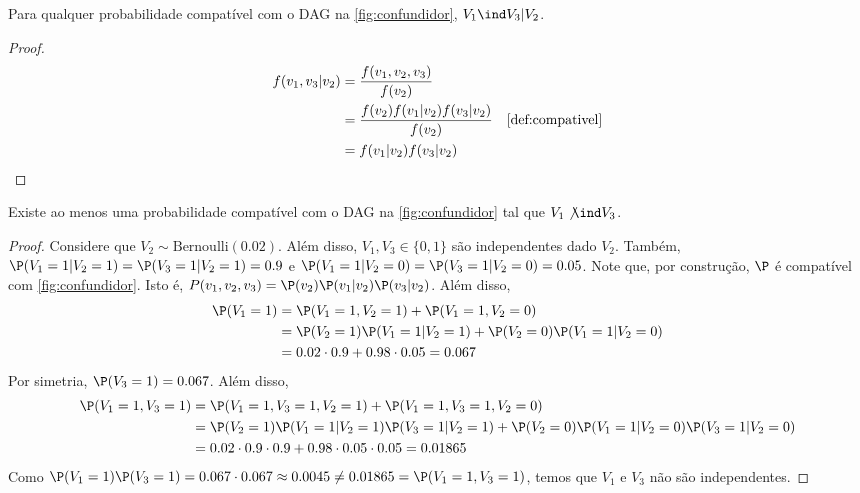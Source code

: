 \begin{lemma}
 \label{lem:conf-ind}
 Para qualquer probabilidade compatível com 
 o DAG na \cref{fig:confundidor},
 $V_1 \ind V_3 | V_2$.
\end{lemma}

\begin{proof}
 \begin{align*}
  f(v_1,v_3|v_2) 
  &= \frac{f(v_1,v_2,v_3)}{f(v_2)} \\
  &= \frac{f(v_2)f(v_1|v_2)f(v_3|v_2)}{f(v_2)} 
  & \text{\cref{def:compativel}} \\
  &= f(v_1|v_2)f(v_3|v_2)
 \end{align*}
\end{proof}

\begin{lemma}
 \label{lem:conf-dep}
 Existe ao menos uma probabilidade compatível com
 o DAG na \cref{fig:confundidor} tal que
 $V_1 \not\ind V_3$.
\end{lemma}

\begin{proof}
 Considere que $V_2 \sim \text{Bernoulli}(0.02)$.
 Além disso, $V_1, V_3 \in \{0,1\}$ são independentes dado $V_2$. 
 Também,
 $\P(V_1 = 1|V_2 = 1) = \P(V_3 = 1|V_2 = 1) = 0.9$ e
 $\P(V_1 = 1|V_2 = 0) = \P(V_3 = 1|V_2 = 0) = 0.05$.
 Note que, por construção, $\P$ é 
 compatível com \cref{fig:confundidor}.
 Isto é, $P(v_1,v_2,v_3) = \P(v_2)\P(v_1|v_2)\P(v_3|v_2)$.
 Além disso,
 \begin{align*}
  \P(V_1 = 1) &= \P(V_1 = 1, V_2 = 1) + \P(V_1 = 1, V_2 = 0) \\
              &= \P(V_2=1)\P(V_1=1|V_2=1)
               +\P(V_2=0)\P(V_1=1|V_2=0) \\
              &= 0.02 \cdot 0.9 + 0.98 \cdot 0.05= 0.067
 \end{align*}
 Por simetria, $\P(V_3=1) = 0.067$. Além disso,
 \begin{align*}
  \P(V_1 = 1, V_3 = 1)
  &= \P(V_1 = 1, V_3 = 1, V_2 = 1) 
  +  \P(V_1 = 1, V_3 = 1, V_2 = 0) \\
  &= \P(V_2 = 1)\P(V_1 = 1|V_2 = 1)\P(V_3 = 1|V_2 = 1)
  +  \P(V_2 = 0)\P(V_1 = 1|V_2 = 0)\P(V_3 = 1|V_2 = 0) \\
  &= 0.02 \cdot 0.9 \cdot 0.9 + 0.98 \cdot 0.05 \cdot 0.05 = 0.01865
 \end{align*}
 Como $\P(V_1=1)\P(V_3=1) = 0.067 \cdot 0.067 \approx 0.0045 \neq 0.01865 = \P(V_1=1,V_3=1)$,
 temos que $V_1$ e $V_3$ não são independentes.
\end{proof}

